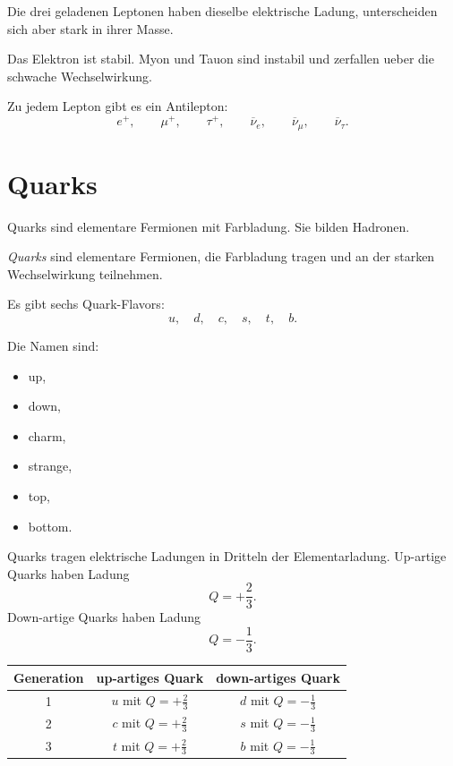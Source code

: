 \begin{conceptbox}
Die drei geladenen Leptonen haben dieselbe elektrische Ladung, unterscheiden sich
aber stark in ihrer Masse.

Das Elektron ist stabil.
Myon und Tauon sind instabil und zerfallen ueber die schwache Wechselwirkung.
\end{conceptbox}

\begin{notebox}
Zu jedem Lepton gibt es ein Antilepton:
\[
    e^+,
    \qquad
    \mu^+,
    \qquad
    \tau^+,
    \qquad
    \overline{\nu}_e,
    \qquad
    \overline{\nu}_\mu,
    \qquad
    \overline{\nu}_\tau.
\]
\end{notebox}

\section{Quarks}

Quarks sind elementare Fermionen mit Farbladung.
Sie bilden Hadronen.

\begin{definitionbox}
\emph{Quarks} sind elementare Fermionen, die Farbladung tragen und an der starken
Wechselwirkung teilnehmen.
\end{definitionbox}

\begin{conceptbox}
Es gibt sechs Quark-Flavors:
\[
    u,\quad d,\quad c,\quad s,\quad t,\quad b.
\]

Die Namen sind:
\begin{itemize}
    \item up,
    \item down,
    \item charm,
    \item strange,
    \item top,
    \item bottom.
\end{itemize}
\end{conceptbox}

\begin{notebox}
Quarks tragen elektrische Ladungen in Dritteln der Elementarladung.
Up-artige Quarks haben Ladung
\[
    Q=+\frac{2}{3}.
\]
Down-artige Quarks haben Ladung
\[
    Q=-\frac{1}{3}.
\]
\end{notebox}

\begin{center}
\begin{tabular}{|c|c|c|}
\hline
Generation & up-artiges Quark & down-artiges Quark \\
\hline
1 & $u$ mit $Q=+\frac{2}{3}$ & $d$ mit $Q=-\frac{1}{3}$ \\
\hline
2 & $c$ mit $Q=+\frac{2}{3}$ & $s$ mit $Q=-\frac{1}{3}$ \\
\hline
3 & $t$ mit $Q=+\frac{2}{3}$ & $b$ mit $Q=-\frac{1}{3}$ \\
\hline
\end{tabular}
\end{center}

